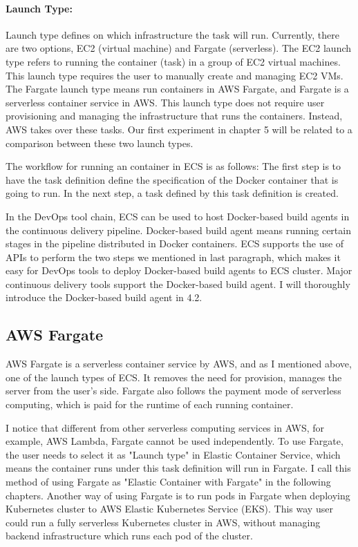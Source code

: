 \paragraph{Launch Type:} Launch type defines on which infrastructure the task will run. Currently, there are two options, EC2 (virtual machine) and Fargate (serverless). The EC2 launch type refers to running the container (task) in a group of EC2 virtual machines. This launch type requires the user to manually create and managing EC2 VMs. The Fargate launch type means run containers in AWS Fargate, and Fargate is a serverless container service in AWS. This launch type does not require user provisioning and managing the infrastructure that runs the containers. Instead, AWS takes over these tasks. Our first experiment in chapter 5 will be related to a comparison between these two launch types.
\par
The workflow for running an container in ECS is as follows:
The first step is to have the task definition define the specification of the Docker container that is going to run. In the next step, a task defined by this task definition is created.
\par
In the DevOps tool chain, ECS can be used to host Docker-based build agents in the continuous delivery pipeline. Docker-based build agent means running certain stages in the pipeline distributed in Docker containers. 
ECS supports the use of APIs to perform the two steps we mentioned in last paragraph, which makes it easy for DevOps tools to deploy Docker-based build agents to ECS cluster.
Major continuous delivery tools support the Docker-based build agent. 
I will thoroughly introduce the Docker-based build agent in 4.2.
\subsection{AWS Fargate}
AWS Fargate is a serverless container service by AWS, and as I mentioned above, one of the launch types of ECS. It removes the need for provision, manages the server from the user's side. Fargate also follows the payment mode of serverless computing, which is paid for the runtime of each running container. 
\par
I notice that different from other serverless computing services in AWS, for example, AWS Lambda, Fargate cannot be used independently. To use Fargate, the user needs to select it as "Launch type" in Elastic Container Service, which means the container runs under this task definition will run in Fargate.  I call this method of using Fargate as "Elastic Container with Fargate" in the following chapters. Another way of using Fargate is to run pods in Fargate when deploying Kubernetes cluster to AWS Elastic Kubernetes Service (EKS). This way user could run a fully serverless Kubernetes cluster in AWS, without managing backend infrastructure which runs each pod of the cluster.
